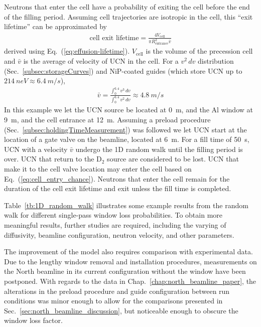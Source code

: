 Neutrons that enter the cell have a probability of exiting the cell before the end of the filling period. Assuming cell trajectories are isotropic in the cell, this ``exit lifetime'' can be approximated by
%
\begin{gather}
    \text{cell exit lifetime} = \frac{4V_\text{cell}}{\pi R_\text{entrance}^2 \bar{v}}
\end{gather}
%
derived using Eq.~(\ref{eq:effusion-lifetime}). $V_\text{cell}$ is the volume of the precession cell and $\bar{v}$ is the average of velocity of UCN in the cell. For a $v^2\,dv$ distribution (Sec.~\ref{subsec:storageCurves}) and NiP-coated guides (which store UCN up to $\qty{214}{neV}\approx\qty{6.4}{m\per s}$), 
%
\begin{gather}
    \bar{v}=\frac{\int_0^{6.4}{v^3\,dv}}{\int_0^{6.4}{v^2\,dv}}\approx \qty{4.8}{m\per s}
\end{gather}
%
In this example we let the UCN source be located at \qty{0}{m}, and the Al window at \qty{9}{m}, and the cell entrance at \qty{12}{m}. Assuming a preload procedure (Sec.~\ref{subsec:holdingTimeMeasurement}) was followed we let UCN start at the location of a gate valve on the beamline, located at \qty{6}{m}. For a fill time of \qty{50}{s}, UCN with a velocity $\bar{v}$ undergo the 1D random walk until the filling period is over. UCN that return to the D$_2$ source are considered to be lost. UCN that make it to the cell valve location may enter the cell based on Eq.~(\ref{eq:cell_entry_chance}). Neutrons that enter the cell remain for the duration of the cell exit lifetime and exit unless the fill time is completed.

Table~\ref{tb:1D_random_walk} illustrates some example results from the random walk for different single-pass window loss probabilities. To obtain more meaningful results, further studies are required, including the varying of diffusivity, beamline configuration, neutron velocity, and other parameters. 

The improvement of the model also requires comparison with experimental data. Due to the lengthy window removal and installation procedures, measurements on the North beamline in its current configuration without the window have been postponed. With regards to the data in Chap.~\ref{chap:north_beamline_paper}, the alterations in the preload procedure and guide configuration between run conditions was minor enough to allow for the comparisons presented in Sec.~\ref{sec:north_beamline_discussion}, but noticeable enough to obscure the window loss factor.

